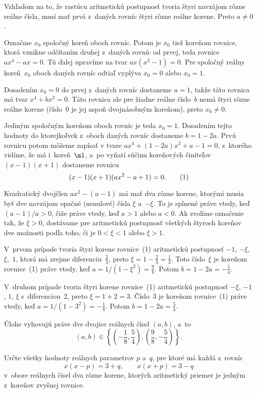 ﻿{%
Vzhľadom na to, že rastúcu aritmetickú postupnosť tvoria štyri navzájom
rôzne reálne čísla, musí mať prvá z~daných rovníc štyri rôzne reálne korene. Preto $a\ne 0$.

Označme $x_0$ spoločný koreň oboch rovníc. Potom je $x_0$ tiež koreňom
rovnice, ktorá vznikne odčítaním druhej z~daných rovníc od prvej, teda rovnice
$ax^4-ax=0.$ Tú ďalej upravíme na tvar $ax(x^3-1)=0.$
Pre spoločný reálny koreň~$x_0$ oboch daných rovníc odtiaľ vyplýva $x_0=0$ alebo
$x_0=1$.

Dosadením $x_0=0$ do prvej z~daných rovníc dostaneme $a=1$, takže táto rovnica má
tvar $x^4+bx^2=0.$
Táto rovnica ale pre žiadne reálne číslo~$b$ nemá štyri rôzne reálne korene
(číslo~0 je jej aspoň dvojnásobným koreňom), preto $x_0\ne0$.

Jediným spoločným koreňom oboch rovníc je teda $x_0=1$. Dosadením tejto
hodnoty do ktorejkoľvek z~oboch daných rovníc dostaneme $b=1-2a$. Prvú rovnicu
potom môžeme zapísať v tvare $ax^4+(1-2a)x^2+a-1=0$, z~ktorého vidíme, že má
i~koreň~$\m1$, a~po vyňatí súčinu koreňových činiteľov $(x-1)(x+1)$
dostaneme rovnicu
$$
(x-1)(x+1)(ax^2-a+1)=0.     \tag1
$$

Kvadratický dvojčlen $ax^2-(a-1)$  má mať dva rôzne korene, ktorými musia
byť dve navzájom opačné (nenulové) čísla $\xi$ a~$-\xi$. To je splnené práve vtedy, keď
$(a-1)/a>0$, čiže práve vtedy, keď $a>1$ alebo $a<0$.
Ak zvolíme označenie tak, že $\xi>0$, dostávame pre aritmetickú postupnosť
všetkých štyroch koreňov dve možnosti podľa toho, či je $0<\xi<1$ alebo $\xi>1$.


V~prvom prípade tvoria štyri korene rovnice~(1) aritmetickú postupnosť $-1$, ${-\xi}$, $\xi$,~$1$,
ktorá má zrejme diferenciu~$\frac23$, preto $\xi=1-\frac23=\frac13$.
Toto číslo~$\xi$ je koreňom rovnice~(1) práve vtedy, keď $a=1/(1-\xi^2)=\frac98$.
Potom $b=1-2a=-\frac54$.

V~druhom prípade tvoria štyri korene rovnice~(1) aritmetickú postupnosť ${-\xi}$, $-1$, $1$, $\xi$
s~diferenciou~2, preto $\xi=1+2=3$.
Číslo~3 je koreňom rovnice~(1) práve vtedy, keď $a=1/(1-3^2)=-\frac18$.
Potom $b=1-2a=\frac54$.

\zaver
Úlohe vyhovujú práve dve dvojice reálnych čísel $(a,b)$, a~to
$$
(a,b)\in\left\{\left(-\frac18,\frac54\right),\left(\frac98,-\frac54\right)\right\}.
$$

Určte všetky hodnoty reálnych parametrov $p$ a~$q$, pre ktoré má každá
z~rovníc
$$
x(x-p)=3+q, \qquad x(x+p)=3-q
$$
v~obore reálnych čísel dva rôzne korene, ktorých aritmetický priemer je
jedným z~koreňov zvyšnej rovnice.
\vpravo{[59--B--S--1]}

}
